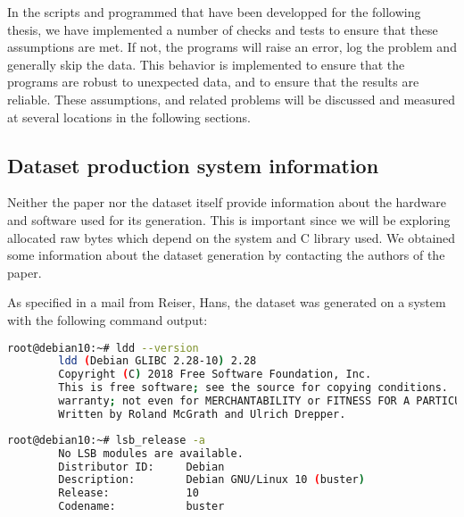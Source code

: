     In the scripts and programmed that have been developped for the following thesis, we have implemented a number of checks and tests to ensure that these assumptions are met. If not, the programs will raise an error, log the problem and generally skip the data. This behavior is implemented to ensure that the programs are robust to unexpected data, and to ensure that the results are reliable. These assumptions, and related problems will be discussed and measured at several locations in the following sections.

    \subsection{Dataset production system information}\label{sec:methods:dataset:production_system_information}
    Neither the paper  nor the dataset itself provide information about the hardware and software used for its generation. This is important since we will be exploring allocated raw bytes which depend on the system and C library used. We obtained some information about the dataset generation by contacting the authors of the paper. 

    As specified in a mail from Reiser, Hans, the dataset was generated on a system with the following command output:

    \begin{minipage}{\dimexpr\linewidth-20pt}
    \begin{lstlisting}[language=bash, caption={Command and logs of the C-library version used for the dataset generation}]
        root@debian10:~# ldd --version
        ldd (Debian GLIBC 2.28-10) 2.28
        Copyright (C) 2018 Free Software Foundation, Inc.
        This is free software; see the source for copying conditions.  There is NO
        warranty; not even for MERCHANTABILITY or FITNESS FOR A PARTICULAR PURPOSE.
        Written by Roland McGrath and Ulrich Drepper.
    \end{lstlisting}
    \end{minipage}

    \begin{minipage}{\dimexpr\linewidth-20pt}
    \begin{lstlisting}[language=bash, caption={Command and logs of the Linux Standard Base Release used for the dataset generation}]
        root@debian10:~# lsb_release -a
        No LSB modules are available.
        Distributor ID:     Debian
        Description:        Debian GNU/Linux 10 (buster)
        Release:            10
        Codename:           buster
    \end{lstlisting}
    \end{minipage}

